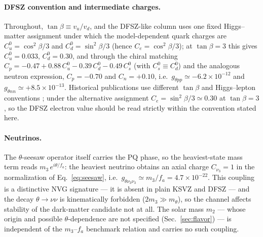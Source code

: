 \documentclass[11pt,a4paper]{article}
\begin{document}
\paragraph{DFSZ convention and intermediate charges.}
Throughout, $\tan\beta \equiv v_u/v_d$, and the DFSZ-like column uses one
fixed Higgs--matter assignment under which the model-dependent quark
charges are $C_u^{0} = \cos^{2}\!\beta/3$ and $C_d^{0} = \sin^{2}\!\beta/3$
(hence $C_e = \cos^{2}\!\beta/3$); at $\tan\beta = 3$ this gives
$C_u^{0} = 0.033$, $C_d^{0} = 0.30$, and through the chiral matching
$C_p = -0.47 + 0.88\,C_u^{0} - 0.39\,C_d^{0} - 0.49\,C_s^{0}$ (with
$C_s^{0} \equiv C_d^{0}$) and the analogous neutron expression,
$C_p = -0.70$ and $C_n = +0.10$, i.e.\
$g_{\theta pp} \simeq -6.2\times 10^{-12}$ and
$g_{\theta nn} \simeq +8.5\times 10^{-13}$.
Historical publications use different $\tan\beta$ and Higgs--lepton
conventions \cite{AstroBounds}; under the alternative assignment
$C_e = \sin^{2}\!\beta/3 \simeq 0.30$ at $\tan\beta = 3$, so the DFSZ
electron value should be read strictly within the convention stated here.

\paragraph{Neutrinos.} The $\theta$-seesaw operator itself carries the
PQ phase, so the heaviest-state mass term reads $m_3\,e^{i\theta/f_a}$:
the heaviest neutrino obtains an axial charge $C_{\nu_3} = 1$ in the
normalization of Eq.~\eqref{eq:seesaw}, i.e.\
$g_{\theta\nu_3\nu_3} \simeq m_3/f_a =
4.7\times 10^{-22}$. This coupling is a distinctive NVG signature --- it is
absent in plain KSVZ and DFSZ --- and the decay $\theta\to\nu\nu$ is
kinematically forbidden ($2m_3 \gg m_\theta$), so the channel affects
stability of the dark-matter candidate not at all. The solar mass $m_2$ ---
whose origin and possible $\theta$-dependence are not specified
(Sec.~\ref{sec:flavor}) --- is independent of the
$m_3$--$f_a$ benchmark relation and carries no such coupling.
\end{document}
